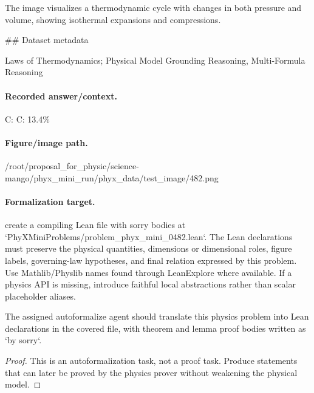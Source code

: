 The image visualizes a thermodynamic cycle with changes in both pressure and volume, showing isothermal expansions and compressions.

\#\# Dataset metadata

Laws of Thermodynamics; Physical Model Grounding Reasoning, Multi-Formula Reasoning

\paragraph{Recorded answer/context.}
C: C: 13.4\%

\paragraph{Figure/image path.}
/root/proposal\_for\_physic/science-mango/phyx\_mini\_run/phyx\_data/test\_image/482.png

\paragraph{Formalization target.}
create a compiling Lean file with sorry bodies at `PhyXMiniProblems/problem\_phyx\_mini\_0482.lean`. The Lean declarations must preserve the physical quantities, dimensions or dimensional roles, figure labels, governing-law hypotheses, and final relation expressed by this problem.
Use Mathlib/Physlib names found through LeanExplore where available. If a physics API is missing, introduce faithful local abstractions rather than scalar placeholder aliases.

\begin{theorem}
\label{thm:physics:phyx_mini_0482:target}
The assigned autoformalize agent should translate this physics problem into Lean declarations in the covered file, with theorem and lemma proof bodies written as `by sorry`.
\end{theorem}
\begin{proof}
This is an autoformalization task, not a proof task. Produce statements that can later be proved by the physics prover without weakening the physical model.
\end{proof}

